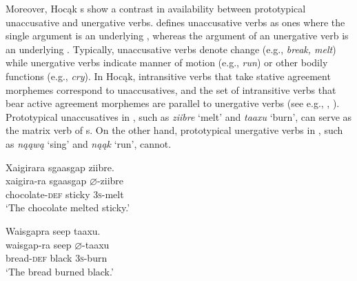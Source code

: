 \documentclass[output=paper]{LSP/langsci}
\begin{document}
Moreover, Hocąk s show a contrast in availability between prototypical unaccusative and unergative verbs. \citet{Perlmutter1978} defines unaccusative verbs as ones where the single argument is an underlying , whereas the argument of an unergative verb is an underlying . Typically, unaccusative verbs denote change (e.g., \textit{break, melt}) while unergative verbs indicate manner of motion (e.g., \textit{run}) or other bodily functions (e.g., \textit{cry}). In Hocąk, intransitive verbs that take stative agreement morphemes correspond to unaccusatives, and the set of intransitive verbs that bear active agreement morphemes are parallel to unergative verbs (see e.g., \citealt{Williamson1984}, \citealt{Woolford2010}). Prototypical unaccusatives in , such as \textit{ziibre} `melt' and \textit{taaxu} `burn', can serve as the matrix verb of s. On the other hand, prototypical unergative verbs in , such as \textit{nąąwą} `sing' and \textit{nąąk} `run', cannot.
 

\begin{exe}
\ex\label{ex:rosen:19}
\begin{xlist}

\ex \glll Xaigirara sgaasgap {ziibre}. \\
 xaigira-ra sgaasgap {$\varnothing$}-ziibre\\
chocolate-\textsc{def} sticky \textsc{3s}-melt\\
\glt `The chocolate melted sticky.'

\ex \glll Waisgapra seep {taaxu}.\\
 waisgap-ra seep {$\varnothing$}-taaxu\\
bread-\textsc{def} black \textsc{3s}-burn\\
\glt `The bread burned black.'

\end{xlist}
\end{exe}

\begin{exe}
\ex\label{ex:rosen:20}
\begin{xlist}



\end{xlist}
\end{exe}
 
\end{document}
